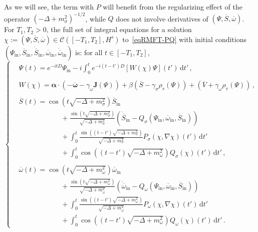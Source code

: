 \documentclass[AHL,Unicode,longabstracts,published]{cedram}
\newcommand{\rmin}{\mathrm{in}}
\newcommand{\cC}{\mathcal{C}}
\renewcommand\bar{\overline}
\renewcommand\d[1]{{\ensuremath{\,\text{d}#1}}}
\newcommand{\dps}{\displaystyle}
\begin{document}
As we will see, the term with $P$ will benefit from the regularizing effect of the operator $(-\Delta+m_\sigma^2)^{-1/2}$, while $Q$ does not involve derivatives of $(\Psi, \overline{S}, \overline{\omega})$. For $T_1,T_2>0$, the full set of integral equations for a solution $\chi:=(\Psi, \overline{S}, \overline{\omega})\in\cC([-T_1,T_2],H^s)$ to~\eqref{eqRMFT-PQ} with initial conditions $(\Psi_\rmin, \overline{S}_\rmin, \dot{\overline{S}}_\rmin, \overline{\omega}_\rmin, \dot{\overline{\omega}}_\rmin)$ is: for all $t\in[-T_1,T_2]$,
\begin{equation}
\begin{cases}\label{eq:Phidef}
&\dps\Psi(t) = e^{-itD}\Psi_\rmin -i\int_0^te^{-i(t-t')D}[W(\chi)\Psi](t')
\d t'\,,
\\
\\
&\dps W(\chi) =
\bm \alpha \cdot \left(- \overline{\bm \omega}-\gamma_\omega{\bm J}(\Psi)\right) +\beta \left(\overline{S}-\gamma_\sigma\rho_s(\Psi)\right) +\left(\overline{V}+ \gamma_\omega \rho_v(\Psi)
\right)\,,
\\
\\
& \dps\bar{S}(t)=
\cos\left(t\sqrt{-\Delta + m^2_\sigma}\right)\overline S_\rmin\\
&\dps\qquad\qquad\qquad + \frac{\sin\left(t\sqrt{-\Delta + m^2_\sigma}\right)}{\sqrt{-\Delta + m^2_\sigma}}\left(\dot{\overline{S}}_\rmin -Q_\sigma(\Psi_\rmin, \overline{\omega}_\rmin, \overline{S}_\rmin)\right)
\\&\dps\qquad\qquad\qquad +\int_0^t\frac{\sin\left((t-t')\sqrt{-\Delta + m^2_\sigma}\right)}{\sqrt{-\Delta + m^2_\sigma}}P_\sigma(\chi, \nabla\chi)(t')\d t'\\
&\dps\qquad\qquad\qquad +\int_0^t\cos\left((t-t')\sqrt{-\Delta + m^2_\omega}\right) Q_\sigma(\chi)(t')\d t'
\,, \\
\\
& \dps\bar{\omega}(t)=
\cos\left(t\sqrt{-\Delta + m^2_\omega}\right)\overline{\omega}_\rmin\\
&\dps\qquad\qquad\qquad + \frac{\sin\left(t\sqrt{-\Delta + m^2_\omega}\right)}{\sqrt{-\Delta + m^2_\omega}}\left(\dot{\overline{\omega}}_\rmin - Q_\omega(\Psi_\rmin, \overline{\omega}_\rmin, \overline{S}_\rmin)\right)
\\&\dps\qquad\qquad\qquad +\int_0^t\frac{\sin\left((t-t')\sqrt{-\Delta + m^2_\omega}\right)}{\sqrt{-\Delta + m^2_\omega}}P_\omega(\chi, \nabla\chi)(t')\d t'\\
&\dps\qquad\qquad\qquad +\int_0^t\cos\left((t-t')\sqrt{-\Delta + m^2_\omega}\right) Q_\omega(\chi)(t')\d t'
\,.
\end{cases}
\end{equation}
\end{document}

